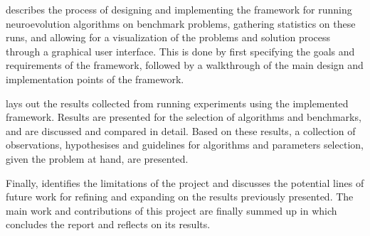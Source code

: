  describes the process of designing and implementing the framework for running neuroevolution algorithms on benchmark problems,
gathering statistics on these runs, and allowing for a visualization of the problems and solution process through a graphical user interface. This is done by first
specifying the goals and requirements of the framework, followed by a walkthrough of the main design and implementation points of the framework.

 lays out the results collected from running experiments using the implemented framework.
Results are presented for the selection of algorithms and benchmarks, and are discussed and compared in detail. Based on these results, a collection of
observations, hypothesises and guidelines for algorithms and parameters selection, given the problem at hand, are presented.

Finally,  identifies the limitations of the project and discusses the potential lines of future work for refining and expanding on the results
previously presented. The main work and contributions of this project are finally summed up in  which concludes the report and reflects on its
results.
